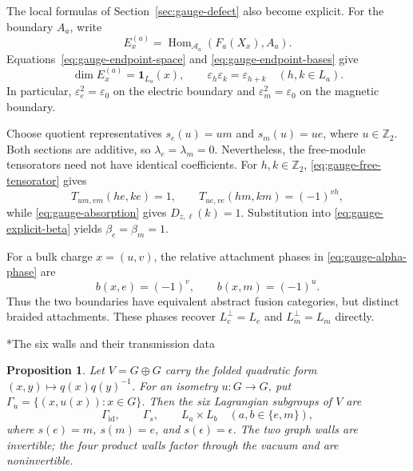 \documentclass[12pt]{amsart}
\makeatletter
\renewcommand\subsection{\@startsection{subsection}{2}%
  \z@{.5\linespacing\@plus.7\linespacing}{-.5em}%
  {\normalfont\bfseries}}
\numberwithin{equation}{section}
\newtheorem{prop}[theorem]{Proposition}
\theoremstyle{definition}
\makeatother
\begin{document}
The local formulas of Section~\ref{sec:gauge-defect} also become
explicit. For the boundary $A_a$, write
$$
E_x^{(a)}
=\operatorname{Hom}_{\mathcal A_a}(F_a(X_x),A_a).
$$
Equations~\eqref{eq:gauge-endpoint-space} and
\eqref{eq:gauge-endpoint-bases} give
$$
\dim E_x^{(a)}=\mathbf1_{L_a}(x),\qquad
\varepsilon_h\varepsilon_k=\varepsilon_{h+k}
\quad(h,k\in L_a).
$$
In particular, $\varepsilon_e^2=\varepsilon_0$ on the electric
boundary and $\varepsilon_m^2=\varepsilon_0$ on the magnetic boundary.

Choose quotient representatives $s_e(u)=um$ and $s_m(u)=ue$,
where $u\in\mathbb Z_2$. Both sections are additive, so
$\lambda_e=\lambda_m=0$. Nevertheless, the free-module tensorators
need not have identical coefficients. For $h,k\in\mathbb Z_2$,
\eqref{eq:gauge-free-tensorator} gives
$$
T_{um,vm}(he,ke)=1,\qquad
T_{ue,ve}(hm,km)=(-1)^{vh},
$$
while \eqref{eq:gauge-absorption} gives $D_{z,\ell}(k)=1$.
Substitution into \eqref{eq:gauge-explicit-beta} yields
$\beta_e=\beta_m=1$.

For a bulk charge $x=(u,v)$, the relative attachment phases in
\eqref{eq:gauge-alpha-phase} are
$$
b(x,e)=(-1)^v,\qquad b(x,m)=(-1)^u.
$$
Thus the two boundaries have equivalent abstract fusion categories,
but distinct braided attachments. These phases recover
$L_e^\perp=L_e$ and $L_m^\perp=L_m$ directly.

\subsection*{The six walls and their transmission data}
\begin{prop}
\label{prop:toric-six-walls}
Let $V=G\oplus G$ carry the folded quadratic form
$(x,y)\mapsto q(x)q(y)^{-1}$.
For an isometry $u:G\to G$, put
$\Gamma_u=\{(x,u(x)):x\in G\}$.
Then the six Lagrangian subgroups of $V$ are
\begin{equation}
\label{eq:gauge-toric-walls}
\Gamma_{\mathrm{id}},
\qquad
\Gamma_s,
\qquad
L_a\times L_b
\quad(a,b\in\{e,m\}),
\end{equation}
where $s(e)=m$, $s(m)=e$, and $s(\epsilon)=\epsilon$.
The two graph walls are invertible; the four product walls
factor through the vacuum and are noninvertible.
\end{prop}
\end{document}
